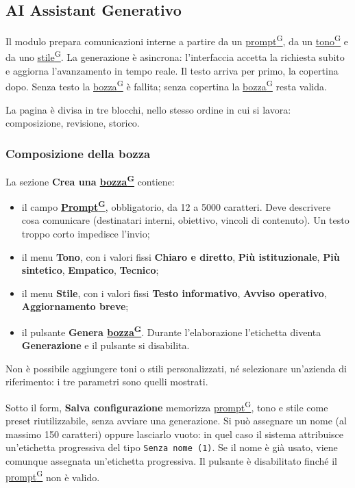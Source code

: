 \documentclass[a4paper,12pt]{article}
\providecommand{\glslink}[2]{\href{https://alittlebyte-19.github.io/Documentazione/glossario.html\#gls-#1}{\underline{#2}\textsuperscript{\scriptsize G}}}
\newcommand{\ui}[1]{\textbf{\textsf{#1}}}
\begin{document}
\subsection{AI Assistant Generativo}

Il modulo prepara comunicazioni interne a partire da un \glslink{prompt}{prompt}, da un \glslink{tono-comunicativo}{tono} e da uno \glslink{stile-editoriale}{stile}. La generazione è asincrona: l'interfaccia accetta la richiesta subito e aggiorna l'avanzamento in tempo reale. Il testo arriva per primo, la copertina dopo. Senza testo la \glslink{bozza-draft}{bozza} è fallita; senza copertina la \glslink{bozza-draft}{bozza} resta valida.

La pagina è divisa in tre blocchi, nello stesso ordine in cui si lavora: composizione, revisione, storico.

\subsubsection{Composizione della bozza}

La sezione \ui{Crea una \glslink{bozza-draft}{bozza}} contiene:

\begin{itemize}
    \item il campo \ui{\glslink{prompt}{Prompt}}, obbligatorio, da 12 a 5000 caratteri. Deve descrivere cosa comunicare (destinatari interni, obiettivo, vincoli di contenuto). Un testo troppo corto impedisce l'invio;
    \item il menu \ui{Tono}, con i valori fissi \ui{Chiaro e diretto}, \ui{Più istituzionale}, \ui{Più sintetico}, \ui{Empatico}, \ui{Tecnico};
    \item il menu \ui{Stile}, con i valori fissi \ui{Testo informativo}, \ui{Avviso operativo}, \ui{Aggiornamento breve};
    \item il pulsante \ui{Genera \glslink{bozza-draft}{bozza}}. Durante l'elaborazione l'etichetta diventa \ui{Generazione} e il pulsante si disabilita.
\end{itemize}

Non è possibile aggiungere toni o stili personalizzati, né selezionare un'azienda di riferimento: i tre parametri sono quelli mostrati.

Sotto il form, \ui{Salva configurazione} memorizza \glslink{prompt}{prompt}, tono e stile come preset riutilizzabile, senza avviare una generazione. Si può assegnare un nome (al massimo 150 caratteri) oppure lasciarlo vuoto: in quel caso il sistema attribuisce un'etichetta progressiva del tipo \texttt{Senza nome (1)}. Se il nome è già usato, viene comunque assegnata un'etichetta progressiva. Il pulsante è disabilitato finché il \glslink{prompt}{prompt} non è valido.
\end{document}
